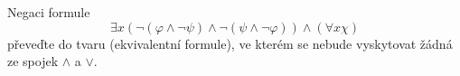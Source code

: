 \subsubsection{}
Negaci formule 
$$\exists x (\neg (\varphi \wedge \neg \psi)\wedge \neg(\psi\wedge
\neg \varphi))\wedge (\forall x \chi )$$ 
převeďte do tvaru (ekvivalentní formule), ve kterém se nebude vyskytovat žádná
ze spojek $\wedge$ a $ \vee $.
